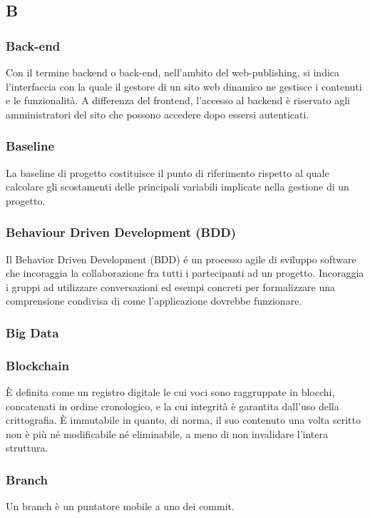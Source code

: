 \subsection*{\textbf{\hfill \Huge{B} \hfill}} 
\subsubsection*{Back-end}
Con il termine backend o back-end, nell'ambito del web-publishing, si indica l'interfaccia con la quale il gestore di un sito web dinamico ne gestisce i contenuti e le funzionalità. A differenza del frontend, l'accesso al backend è riservato agli amministratori del sito che possono accedere dopo essersi autenticati.
\subsubsection*{Baseline}
La baseline di progetto costituisce il punto di riferimento rispetto al quale calcolare gli scostamenti delle principali variabili implicate nella gestione di un progetto.
\subsubsection*{Behaviour Driven Development (BDD)}
Il Behavior Driven Development (BDD) é un processo agile di sviluppo software che incoraggia la collaborazione fra tutti i partecipanti ad un progetto. Incoraggia i gruppi ad utilizzare conversazioni ed esempi concreti per formalizzare una comprensione condivisa di come l'applicazione dovrebbe funzionare.
\subsubsection*{Big Data}

\subsubsection*{Blockchain}
È definita come un registro digitale le cui voci sono raggruppate in blocchi, concatenati in ordine cronologico, e la cui integrità è garantita dall’uso della crittografia. È immutabile in quanto, di norma, il suo contenuto una volta scritto non è più né modificabile né eliminabile, a meno di non invalidare l’intera struttura.
\subsubsection*{Branch}
Un branch è un puntatore mobile a uno dei commit.
